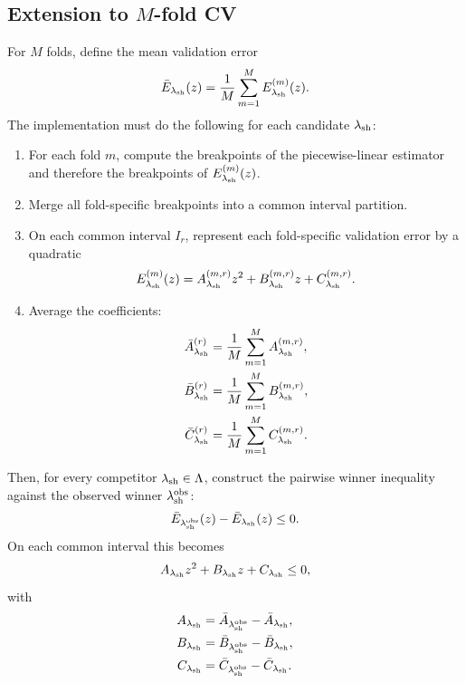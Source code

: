 \documentclass[11pt]{article}
\begin{document}
\subsection{Extension to $M$-fold CV}
For $M$ folds, define the mean validation error
\[
\bar{E}_{\lambda_{\rm sh}}(z) = \frac{1}{M} \sum_{m=1}^{M} E_{\lambda_{\rm sh}}^{(m)}(z).
\]
The implementation must do the following for each candidate $\lambda_{\rm sh}$:
\begin{enumerate}[leftmargin=2em]
    \item For each fold $m$, compute the breakpoints of the piecewise-linear estimator and therefore the breakpoints of $E_{\lambda_{\rm sh}}^{(m)}(z)$.
    \item Merge all fold-specific breakpoints into a common interval partition.
    \item On each common interval $I_r$, represent each fold-specific validation error by a quadratic
    \[
    E_{\lambda_{\rm sh}}^{(m)}(z) = A_{\lambda_{\rm sh}}^{(m,r)} z^2 + B_{\lambda_{\rm sh}}^{(m,r)} z + C_{\lambda_{\rm sh}}^{(m,r)}.
    \]
    \item Average the coefficients:
    \begin{align*}
        \bar{A}_{\lambda_{\rm sh}}^{(r)} &= \frac{1}{M}\sum_{m=1}^M A_{\lambda_{\rm sh}}^{(m,r)}, \\
        \bar{B}_{\lambda_{\rm sh}}^{(r)} &= \frac{1}{M}\sum_{m=1}^M B_{\lambda_{\rm sh}}^{(m,r)}, \\
        \bar{C}_{\lambda_{\rm sh}}^{(r)} &= \frac{1}{M}\sum_{m=1}^M C_{\lambda_{\rm sh}}^{(m,r)}.
    \end{align*}
\end{enumerate}

Then, for every competitor $\lambda_{\rm sh} \in \Lambda$, construct the pairwise winner inequality against the observed winner $\lambda_{\rm sh}^{\rm obs}$:
\[
\bar{E}_{\lambda_{\rm sh}^{\rm obs}}(z) - \bar{E}_{\lambda_{\rm sh}}(z) \le 0.
\]
On each common interval this becomes
\[
A_{\lambda_{\rm sh}} z^2 + B_{\lambda_{\rm sh}} z + C_{\lambda_{\rm sh}} \le 0,
\]
with
\begin{align*}
A_{\lambda_{\rm sh}} &= \bar{A}_{\lambda_{\rm sh}^{\rm obs}} - \bar{A}_{\lambda_{\rm sh}}, \\
B_{\lambda_{\rm sh}} &= \bar{B}_{\lambda_{\rm sh}^{\rm obs}} - \bar{B}_{\lambda_{\rm sh}}, \\
C_{\lambda_{\rm sh}} &= \bar{C}_{\lambda_{\rm sh}^{\rm obs}} - \bar{C}_{\lambda_{\rm sh}}.
\end{align*}
\end{document}
